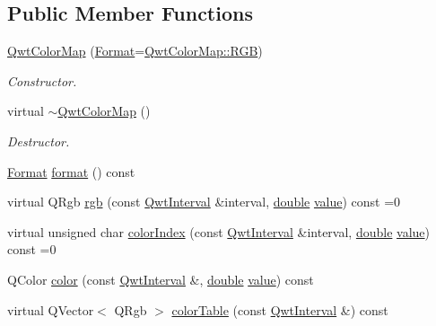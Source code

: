 \subsection*{Public Member Functions}
\begin{DoxyCompactItemize}
\item 
\hyperlink{class_qwt_color_map_a2ab0a6041ea6d37c0609ca2e3bd976ca}{Qwt\-Color\-Map} (\hyperlink{class_qwt_color_map_a9e5570790910fa3894887bca7dc5a670}{Format}=\hyperlink{class_qwt_color_map_a9e5570790910fa3894887bca7dc5a670a663473fd836d9a84fe48ae1755de326a}{Qwt\-Color\-Map\-::\-R\-G\-B})
\begin{DoxyCompactList}\small\item\em Constructor. \end{DoxyCompactList}\item 
virtual \hyperlink{class_qwt_color_map_af20e4ffdb3c5d34f5a6dc301bcbb9f7e}{$\sim$\-Qwt\-Color\-Map} ()
\begin{DoxyCompactList}\small\item\em Destructor. \end{DoxyCompactList}\item 
\hyperlink{class_qwt_color_map_a9e5570790910fa3894887bca7dc5a670}{Format} \hyperlink{class_qwt_color_map_a436802833ae1d4694f376655bc3d75be}{format} () const 
\item 
virtual Q\-Rgb \hyperlink{class_qwt_color_map_aaed0bb47b6379696c588732348438136}{rgb} (const \hyperlink{class_qwt_interval}{Qwt\-Interval} \&interval, \hyperlink{_super_l_u_support_8h_a8956b2b9f49bf918deed98379d159ca7}{double} \hyperlink{glext_8h_aa0e2e9cea7f208d28acda0480144beb0}{value}) const =0
\item 
virtual unsigned char \hyperlink{class_qwt_color_map_a762baa2edca8773ec09e0c1c5df2cf04}{color\-Index} (const \hyperlink{class_qwt_interval}{Qwt\-Interval} \&interval, \hyperlink{_super_l_u_support_8h_a8956b2b9f49bf918deed98379d159ca7}{double} \hyperlink{glext_8h_aa0e2e9cea7f208d28acda0480144beb0}{value}) const =0
\item 
Q\-Color \hyperlink{class_qwt_color_map_a35f74175e963d18e451a9fd4421ede1f}{color} (const \hyperlink{class_qwt_interval}{Qwt\-Interval} \&, \hyperlink{_super_l_u_support_8h_a8956b2b9f49bf918deed98379d159ca7}{double} \hyperlink{glext_8h_aa0e2e9cea7f208d28acda0480144beb0}{value}) const 
\item 
virtual Q\-Vector$<$ Q\-Rgb $>$ \hyperlink{class_qwt_color_map_a4ccc23356e058783071b06dee437b6d7}{color\-Table} (const \hyperlink{class_qwt_interval}{Qwt\-Interval} \&) const 
\end{DoxyCompactItemize}


